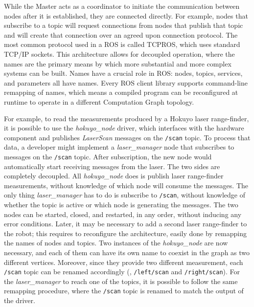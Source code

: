 While the Master acts as a coordinator to initiate the communication between nodes after it is established, they are connected directly. For example, nodes that subscribe to a topic will request connections from nodes that publish that topic and will create that connection over an agreed upon connection protocol. The most common protocol used in a ROS is called TCPROS, which uses standard TCP/IP sockets. This architecture allows for decoupled operation, where the names are the primary means by which more substantial and more complex systems can be built. Names have a crucial role in ROS: nodes, topics, services, and parameters all have names. Every ROS client library supports command-line remapping of names, which means a compiled program can be reconfigured at runtime to operate in a different Computation Graph topology.

For example, to read the measurements produced by a Hokuyo laser range-finder, it is possible to use the \textit{hokuyo\_node} driver, which interfaces with the hardware component and publishes \textit{LaserScan} messages on the \texttt{/scan} topic. To process that data, a developer might implement a \textit{laser\_manager} node that subscribes to messages on the \texttt{/scan} topic. After subscription, the new node would automatically start receiving messages from the laser. The two sides are completely decoupled. All \textit{hokuyo\_node} does is publish laser range-finder measurements, without knowledge of which node will consume the messages. The only thing \textit{laser\_ma\-na\-ger} has to do is subscribe to \texttt{/scan}, without knowledge of whether the topic is active or which node is generating the messages. The two nodes can be started, closed, and restarted, in any order, without inducing any error conditions. Later, it may be necessary to add a second laser range-finder to the robot; this requires to reconfigure the architecture, easily done by remapping the names of nodes and topics. Two instances of the \textit{hokuyo\_node} are now necessary, and each of them can have its own name to coexist in the graph as two different vertices. Moreover, since they provide two different measurement, each \texttt{/scan} topic can be renamed accordingly (\eg, \texttt{/left/scan} and \texttt{/right/scan}). For the \textit{laser\_manager} to reach one of the topics, it is possible to follow the same remapping procedure, where the \texttt{/scan} topic is renamed to match the output of the driver.

